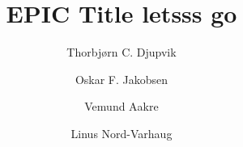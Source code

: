 
\title{EPIC Title letsss go}
\author[1]{Thorbjørn C. Djupvik}
\author[1]{Oskar F. Jakobsen}
\author[1]{Vemund Aakre}
\author[1]{Linus Nord-Varhaug}


\maketitle
